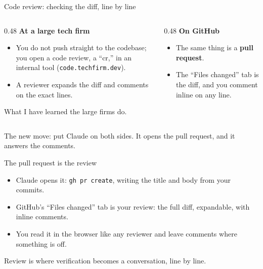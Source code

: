 \documentclass[aspectratio=169,11pt]{beamer}
\begin{document}
\begin{frame}{Code review: checking the diff, line by line}
\begin{columns}[T]
\begin{column}{0.48\textwidth}
\textbf{At a large tech firm}
\begin{itemize}\setlength\itemsep{0.25em}
    \item You do not push straight to the codebase; you open a code review, a ``cr,'' in an internal tool (\texttt{code.techfirm.dev}).
    \item A reviewer expands the diff and comments on the exact lines.
\end{itemize}
{\scriptsize\color{warmgray} What I have learned the large firms do.}
\end{column}
\begin{column}{0.48\textwidth}
\textbf{On GitHub}
\begin{itemize}\setlength\itemsep{0.25em}
    \item The same thing is a \textbf{pull request}.
    \item The ``Files changed'' tab is the diff, and you comment inline on any line.
\end{itemize}
\end{column}
\end{columns}
\vspace{0.45cm}
\alert{The new move: put Claude on both sides. It opens the pull request, and it answers the comments.}
\end{frame}

\begin{frame}{The pull request is the review}
\begin{itemize}\setlength\itemsep{0.3em}
    \item Claude opens it: \texttt{gh pr create}, writing the title and body from your commits.
    \item GitHub's ``Files changed'' tab is your review: the full diff, expandable, with inline comments.
    \item You read it in the browser like any reviewer and leave comments where something is off.
\end{itemize}
\vspace{0.4cm}
\alert{Review is where verification becomes a conversation, line by line.}
\end{frame}
\end{document}
